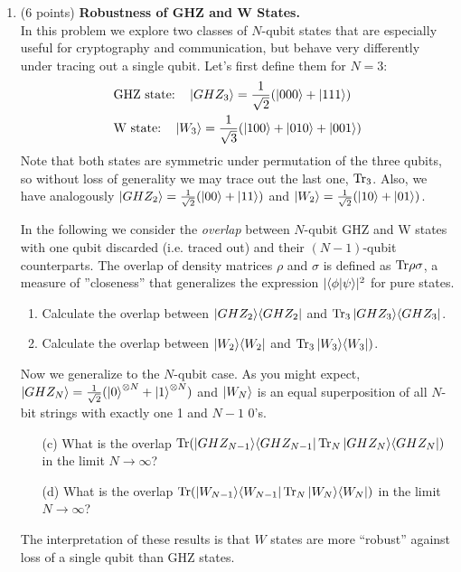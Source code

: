 \documentclass[12pt]{article}
\begin{document}
\begin{enumerate}
\item {(6 points)} {\bf Robustness of GHZ and W States.}\label{ex:robust-GHZ}\\
In this problem we explore two classes of $N$-qubit states that are especially useful for cryptography and communication, but behave very differently under tracing out a single qubit. Let's first define them for $N=3$:
\begin{align*}
& \text{GHZ state:} \quad \ket{GHZ_3} = \frac{1}{\sqrt{2}} (\ket{000}+\ket{111}) \\
& \text{W state:} \quad \ket{W_3} = \frac{1}{\sqrt{3}} (\ket{100}+\ket{010}+\ket{001})
\end{align*}
Note that both states are symmetric under permutation of the three qubits, so without loss of generality we may trace out the last one, $\mathrm{Tr}_3$. Also, we have analogously $\ket{GHZ_2}=\frac{1}{\sqrt{2}} (\ket{00}+\ket{11})$ and $\ket{W_2}=\frac{1}{\sqrt{2}} (\ket{10}+\ket{01})$.

In the following we consider the \textit{overlap} between $N$-qubit GHZ and W states with one qubit discarded (i.e. traced out) and their $(N-1)$-qubit counterparts. The overlap of density matrices $\rho$ and $\sigma$ is defined as $\mathrm{Tr} \rho\sigma$, a measure of ''closeness'' that generalizes the expression $|\langle \phi \vert \psi\rangle|^2$ for pure states.
\begin{enumerate}
\item Calculate the overlap between $\ket{GHZ_2}\!\bra{GHZ_2}$ and $\mathrm{Tr}_3\ket{GHZ_3}\!\bra{GHZ_3}$.
\item Calculate the overlap between  $\ket{W_2}\!\bra{W_2}$ and $\mathrm{Tr}_3\ket{W_3}\!\bra{W_3})$.
\end{enumerate}
Now we generalize to the $N$-qubit case. As you might expect, $\ket{GHZ_N}=\frac{1}{\sqrt{2}} (\ket{0}^{\otimes N}+\ket{1}^{\otimes N})$ and $\ket{W_N}$ is an equal superposition of all $N$-bit strings with exactly one 1 and $N-1$ 0's.
\begin{enumerate}
\item[(c)] What is the overlap $\mathrm{Tr}(\ket{GHZ_{N-1}}\!\bra{GHZ_{N-1}} \mathrm{Tr}_N\ket{GHZ_N}\!\bra{GHZ_N})$ in the limit $N \rightarrow \infty$?
\item[(d)] What is the overlap $\mathrm{Tr}(\ket{W_{N-1}}\!\bra{W_{N-1}} \mathrm{Tr}_N\ket{W_N}\!\bra{W_N})$ in the limit $N \rightarrow \infty$?
\end{enumerate}
The interpretation of these results is that $W$ states are more ``robust'' against loss of a single qubit than GHZ states.


\end{enumerate}
\end{document}
